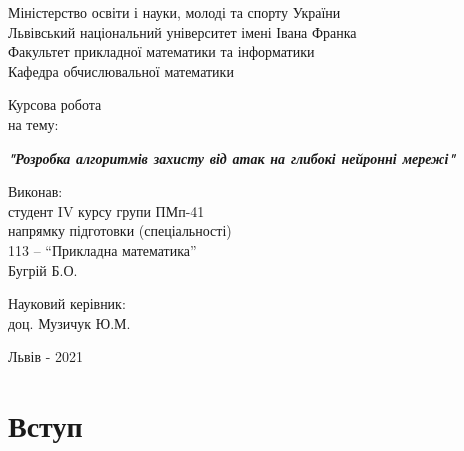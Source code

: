 \documentclass[14pt,a4paper]{extarticle}
\newcounter{e}
\newcounter{tabl}
\numberwithin{equation}{section}
\numberwithin{figure}{section}
\begin{document}
	

 \thispagestyle{empty}

 \begin{center}
	\large
	Міністерство освіти і науки, молоді та спорту України \\
	Львівський національний університет імені Івана Франка \\
	Факультет прикладної математики та інформатики \\
	Кафедра обчислювальної математики
 \end{center}

 \vspace{45pt}

 \vfill

 \begin{center}
	{\Huge{Курсова робота}}\\
	{\large на тему:}
 \end{center}

 \begin{center}\Large
	\textbf{\emph{"Розробка алгоритмів захисту від атак на глибокі нейронні мережі"}}
 \end{center}

 \vfill
 \vskip100pt

 \begin{flushleft}
	\hskip8cm 
	Виконав:
	\\ \hskip8cm 
	студент IV курсу групи ПМп-41
	\\ \hskip8cm
	напрямку підготовки (спеціальності)
	\\ \hskip8cm
	113 -- ``Прикладна математика''
	\\ \hskip8cm
	Бугрій Б.О.
 \end{flushleft}

 \begin{flushleft}
	\hskip8cm 
	Науковий керівник:
	\\ \hskip8cm
	доц. Музичук Ю.М.
 \end{flushleft}

 \vfill

 \begin{center}
	\large
	Львів - 2021
 \end{center}

 \newpage
 \thispagestyle{empty}
 \tableofcontents

 \newpage
 \thispagestyle{empty}
 \section*{Вступ}
 \begin{center}\end{center}
\end{document}
